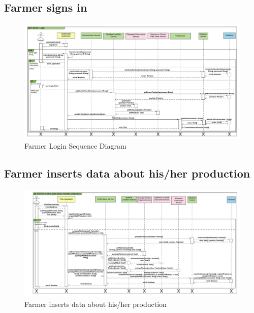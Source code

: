\subsection{Farmer signs in}

\newpage
\begin{landscape}
\begin{figure}[h]
\vspace*{-2cm}
\noindent
\centering
\centerline{\includegraphics[scale= 0.108]{./Images/Sequence diagram/Farmer Login Sequence Diagram.png}}
    \caption{Farmer Login Sequence Diagram}
    \vspace*{-12cm}
\end{figure}
\fillandplacepagenumber
\end{landscape}

\subsection{Farmer inserts data about his/her production}

\newpage
\begin{landscape}
\begin{figure}[h]
\vspace*{-2cm}
\noindent
\centering
\centerline{\includegraphics[scale= 0.108]{./Images/Sequence diagram/Farmer inserts data about his_her production.png}}
    \caption{Farmer inserts data about his/her production}
    \vspace*{-12cm}
\end{figure}
\fillandplacepagenumber
\end{landscape}

